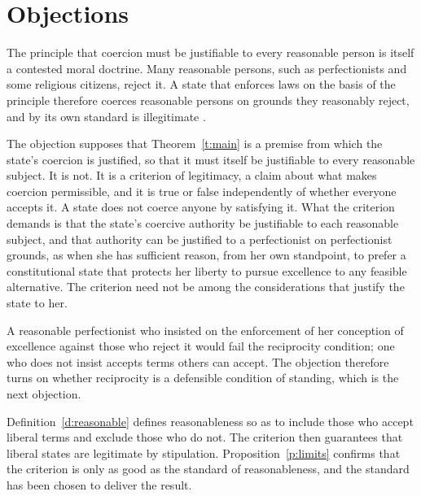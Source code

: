 \documentclass{situationist-preprint}
\begin{document}
\section{Objections}

\begin{objection}
The principle that coercion must be justifiable to every reasonable person is itself a contested moral doctrine. Many reasonable persons, such as perfectionists and some religious citizens, reject it. A state that enforces laws on the basis of the principle therefore coerces reasonable persons on grounds they reasonably reject, and by its own standard is illegitimate \citep{Wall2002,Enoch2015}.
\end{objection}

\begin{reply}
The objection supposes that Theorem~\ref{t:main} is a premise from which the state's coercion is justified, so that it must itself be justifiable to every reasonable subject. It is not. It is a criterion of legitimacy, a claim about what makes coercion permissible, and it is true or false independently of whether everyone accepts it. A state does not coerce anyone by satisfying it. What the criterion demands is that the state's coercive authority be justifiable to each reasonable subject, and that authority can be justified to a perfectionist on perfectionist grounds, as when she has sufficient reason, from her own standpoint, to prefer a constitutional state that protects her liberty to pursue excellence to any feasible alternative. The criterion need not be among the considerations that justify the state to her.

A reasonable perfectionist who insisted on the enforcement of her conception of excellence against those who reject it would fail the reciprocity condition; one who does not insist accepts terms others can accept. The objection therefore turns on whether reciprocity is a defensible condition of standing, which is the next objection.
\end{reply}

\begin{objection}[Gerrymandering]
Definition~\ref{d:reasonable} defines reasonableness so as to include those who accept liberal terms and exclude those who do not. The criterion then guarantees that liberal states are legitimate by stipulation. Proposition~\ref{p:limits} confirms that the criterion is only as good as the standard of reasonableness, and the standard has been chosen to deliver the result.
\end{objection}
\end{document}
